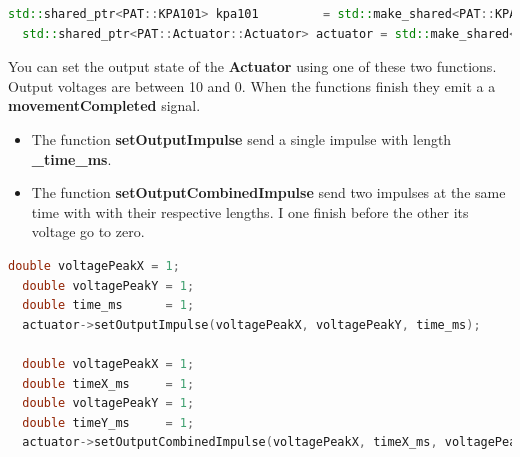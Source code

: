 \begin{lstlisting}[language=c++, gobble=2]
  std::shared_ptr<PAT::KPA101> kpa101         = std::make_shared<PAT::KPA101>();
  std::shared_ptr<PAT::Actuator::Actuator> actuator = std::make_shared<PAT::Actuator::STT254>(kpa101);
\end{lstlisting}

You can set the output state of the \textbf{Actuator} using one of these
two functions. Output voltages are between 10 and 0. When the functions
finish they emit a a \textbf{movementCompleted} signal.

\begin{itemize}
  \tightlist
  \item
        The function \textbf{setOutputImpulse} send a single impulse with
        length \textbf{\_time\_ms}.
  \item
        The function \textbf{setOutputCombinedImpulse} send two impulses at
        the same time with with their respective lengths. I one finish before
        the other its voltage go to zero.
\end{itemize}

\begin{lstlisting}[language=c++, gobble=2]
  double voltagePeakX = 1;
  double voltagePeakY = 1;
  double time_ms      = 1;
  actuator->setOutputImpulse(voltagePeakX, voltagePeakY, time_ms);
  
  double voltagePeakX = 1;
  double timeX_ms     = 1;
  double voltagePeakY = 1;
  double timeY_ms     = 1;
  actuator->setOutputCombinedImpulse(voltagePeakX, timeX_ms, voltagePeakY, timeY_ms);
\end{lstlisting}